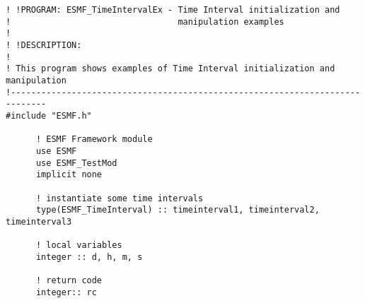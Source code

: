  
\setlength{\oldparskip}{\parskip}
\setlength{\parskip}{1.5ex}
\setlength{\oldparindent}{\parindent}
\setlength{\parindent}{0pt}
\setlength{\oldbaselineskip}{\baselineskip}
\setlength{\baselineskip}{11pt}
 
\def\bv{\begin{verbatim}}
\def\ev{\end{verbatim}}
\def\be{\begin{equation}}
\def\ee{\end{equation}}
\def\bea{\begin{eqnarray}}
\def\eea{\end{eqnarray}}
\def\bi{\begin{itemize}}
\def\ei{\end{itemize}}
\def\bn{\begin{enumerate}}
\def\en{\end{enumerate}}
\def\bd{\begin{description}}
\def\ed{\end{description}}
\def\({\left (}
\def\){\right )}
\def\[{\left [}
\def\]{\right ]}
\def\<{\left  \langle}
\def\>{\right \rangle}
\def\cI{{\cal I}}
\def\diag{\mathop{\rm diag}}
\def\tr{\mathop{\rm tr}}


 

 \begin{verbatim}
! !PROGRAM: ESMF_TimeIntervalEx - Time Interval initialization and 
!                                 manipulation examples
!
! !DESCRIPTION:
!
! This program shows examples of Time Interval initialization and manipulation
!-----------------------------------------------------------------------------
#include "ESMF.h"

      ! ESMF Framework module
      use ESMF
      use ESMF_TestMod
      implicit none

      ! instantiate some time intervals
      type(ESMF_TimeInterval) :: timeinterval1, timeinterval2, timeinterval3

      ! local variables
      integer :: d, h, m, s

      ! return code
      integer:: rc
 
\end{verbatim}
 
